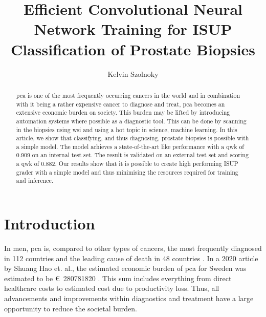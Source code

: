 \documentclass{mod-comjnl}
\begin{document}
\title[Efficient CNN Training for ISUP Classification of Prostate Biopsies]{Efficient Convolutional Neural Network Training for ISUP Classification of Prostate Biopsies}
\author{Kelvin Szolnoky}

\begin{abstract}
  \Acrfull{pca} is one of the most frequently occurring cancers in the world and in combination with it being a rather expensive cancer to diagnose and treat,  \acrshort{pca} becomes an extensive economic burden on society. This burden may be lifted by introducing automation systems where possible as a diagnostic tool. This can be done by scanning in the biopsies using \acrlong{wsi} and using a hot topic in science, machine learning. In this article, we show that classifying, and thus diagnosing, prostate biopsies is possible with a simple model. The model achieves a state-of-the-art like performance with a \acrfull{qwk} of 0.909 on an internal test set. The result is validated on an external test set and scoring a \acrshort{qwk} of 0.882. Our results show that it is possible to create high performing ISUP grader with a simple model and thus minimising the resources required for training and inference.
\end{abstract}

\maketitle

\section{Introduction}
In men, \acrfull{pca} is, compared to other types of cancers, the most frequently diagnosed in 112 countries and the leading cause of death in 48 countries \cite{sung_global_2021}. In a 2020 article by Shuang Hao et. al., the estimated economic burden of \acrshort{pca} for Sweden was estimated to be \SI{280781820}[\euro]{} \cite{hao_economic_2020}. This sum includes everything from direct healthcare costs to estimated cost due to productivity loss. Thus, all advancements and improvements within diagnostics and treatment have a large opportunity to reduce the societal burden.
\end{document}
